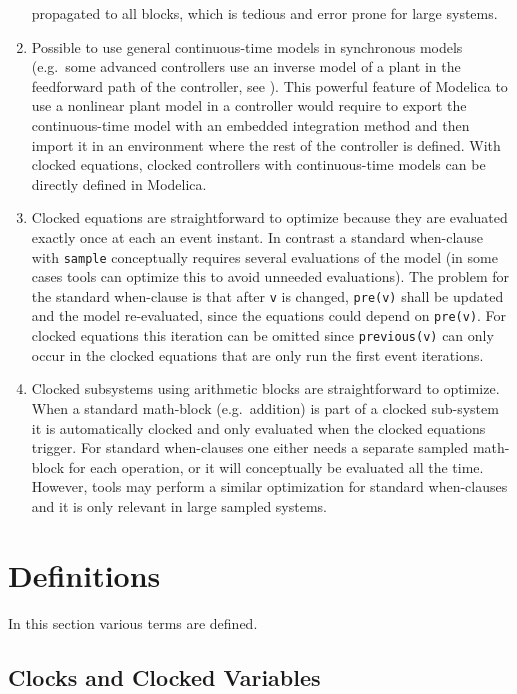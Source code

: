 \begin{nonnormative}
\begin{enumerate}
  propagated to all blocks, which is tedious and error prone for large systems.
\item
  Possible to use general continuous-time models in synchronous models (e.g.\ some advanced controllers use an inverse model of a plant in the feedforward path of the controller, see \textcite{ThummelEtAl2005InverseModels}).
  This powerful feature of Modelica to use a nonlinear plant model in a controller would require to export the continuous-time model with an embedded integration method and then import it in an environment where the rest of the controller is defined.
  With clocked equations, clocked controllers with continuous-time models can be directly defined in Modelica.
\item
  Clocked equations are straightforward to optimize because they are
  evaluated exactly once at each an event instant.
  In contrast a standard when-clause with \lstinline!sample! conceptually
  requires several evaluations of the model (in some cases tools
  can optimize this to avoid unneeded evaluations).
  The problem for the standard when-clause is that after \lstinline!v!
  is changed, \lstinline!pre(v)! shall be updated and the model re-evaluated,
  since the equations could depend on \lstinline!pre(v)!.
  For clocked equations this iteration can be omitted
  since \lstinline!previous(v)! can only occur in the clocked equations
  that are only run the first event iterations.
\item
  Clocked subsystems using arithmetic blocks are straightforward to optimize.
  When a standard math-block (e.g.\ addition) is part of a clocked sub-system it is automatically
  clocked and only evaluated when the clocked equations trigger.
  For standard when-clauses one either needs a separate sampled math-block for each operation, or
  it will conceptually be evaluated all the time.
  However, tools may perform a similar optimization for standard when-clauses
  and it is only relevant in large sampled systems.
\end{enumerate}
\end{nonnormative}

\section{Definitions}\label{definitions}

In this section various terms are defined.

\subsection{Clocks and Clocked Variables}\label{clocks-and-clocked-variables}


